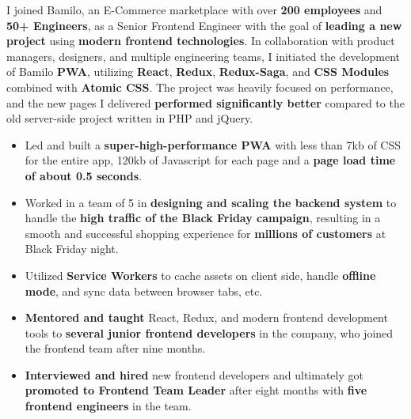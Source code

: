 I joined Bamilo, an E-Commerce marketplace with over \textbf{200 employees} and \textbf{50+ Engineers}, as a Senior Frontend Engineer with the goal of \textbf{leading a new project} using \textbf{modern frontend technologies}. In collaboration with product managers, designers, and multiple engineering teams, I initiated the development of Bamilo \textbf{PWA}, utilizing \textbf{React}, \textbf{Redux}, \textbf{Redux-Saga}, and \textbf{CSS Modules} combined with \textbf{Atomic CSS}. The project was heavily focused on performance, and the new pages I delivered \textbf{performed significantly better} compared to the old server-side project written in PHP and jQuery.
\medskip
\begin{itemize}
    \item Led and built a \textbf{super-high-performance PWA} with less than 7kb of CSS for the entire app, 120kb of Javascript for each page and a \textbf{page load time of about 0.5 seconds}.
    \item Worked in a team of 5 in \textbf{designing and scaling the backend system} to handle the \textbf{high traffic of the Black Friday campaign}, resulting in a smooth and successful shopping experience for \textbf{millions of customers} at Black Friday night.
    \item Utilized \textbf{Service Workers} to cache assets on client side, handle \textbf{offline mode}, and sync data between browser tabs, etc.
    \item \textbf{Mentored and taught} React, Redux, and modern frontend development tools to \textbf{several junior frontend developers} in the company, who joined the frontend team after nine months.
    \item \textbf{Interviewed and hired} new frontend developers and ultimately got \textbf{promoted to Frontend Team Leader} after eight months with \textbf{five frontend engineers} in the team.
\end{itemize}

\bigskip
\divider
\bigskip

